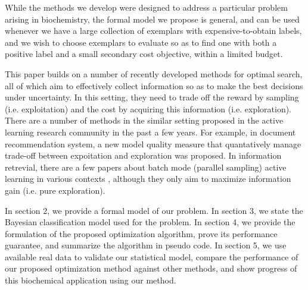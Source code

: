 \documentclass[12pt]{article}
\begin{document}
While the methods we develop were designed to address a particular problem arising in biochemistry, the formal model we propose is general, and can be used whenever we have a large collection of exemplars with expensive-to-obtain labels, and we wish to choose exemplars to evaluate so as to find one with both a positive label and a small secondary cost objective, within a limited budget.

This paper builds on a number of recently developed methods for optimal search, all of which aim to effectively collect information so as to make the best decisions under uncertainty. In this setting, they need to trade off the reward by sampling (i.e. exploitation) and the cost by acquiring this information (i.e. exploration). There are a number of methods in the similar setting proposed in the active learning research community in the past a few years. For example, in document recommendation system, a new model quality measure that quantatively manage trade-off between expoitation and exploration \citep{filter} was proposed. In information retrevial, there are a few papers about batch mode (parallel sampling) active learning in various contexts \citep{Chen2013, Hoi2006, Hoi2006a}, although they only aim to maximize information gain (i.e. pure exploration).


In section 2, we provide a formal model of our problem.  In section 3, we state the Bayesian classification model used for the problem. In section 4, we provide the formulation of the proposed optimization algorithm, prove its performance guarantee, and summarize the algorithm in pseudo code. In section 5, we use available real data to validate our statistical model, compare the performance of our proposed optimization method against
other methods, and show progress of this biochemical application using our method.
\end{document}
